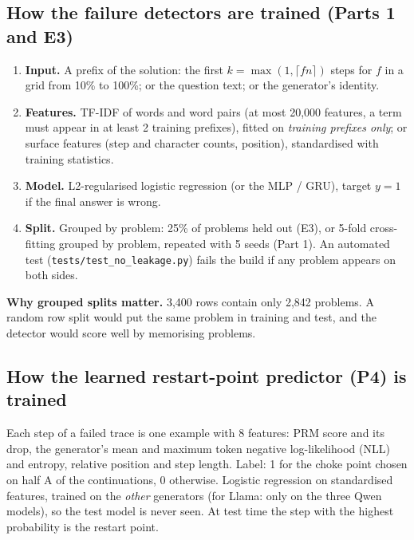 \documentclass[11pt,a4paper]{article}
\begin{document}
\subsection{How the failure detectors are trained (Parts 1 and E3)}
\begin{enumerate}
\item \textbf{Input.} A prefix of the solution: the first $k=\max(1,\lceil fn\rceil)$ steps for $f$ in a
grid from 10\% to 100\%; or the question text; or the generator's identity.
\item \textbf{Features.} TF-IDF of words and word pairs (at most 20,000 features, a term must appear in
at least 2 training prefixes), fitted on \emph{training prefixes only}; or surface features (step and
character counts, position), standardised with training statistics.
\item \textbf{Model.} L2-regularised logistic regression (or the MLP / GRU), target $y=1$ if the final
answer is wrong.
\item \textbf{Split.} Grouped by problem: 25\% of problems held out (E3), or 5-fold cross-fitting
grouped by problem, repeated with 5 seeds (Part 1). An automated test (\texttt{tests/test\_no\_leakage.py})
fails the build if any problem appears on both sides.
\end{enumerate}
\textbf{Why grouped splits matter.} 3,400 rows contain only 2,842 problems. A random row split would
put the same problem in training and test, and the detector would score well by memorising problems.

\subsection{How the learned restart-point predictor (P4) is trained}
Each step of a failed trace is one example with 8 features: PRM score and its drop, the generator's
mean and maximum token negative log-likelihood (NLL) and entropy, relative position and step length.
Label: 1 for the choke point chosen on half A of the continuations, 0 otherwise. Logistic regression on
standardised features, trained on the \emph{other} generators (for Llama: only on the three Qwen
models), so the test model is never seen. At test time the step with the highest probability is the
restart point.
\end{document}
